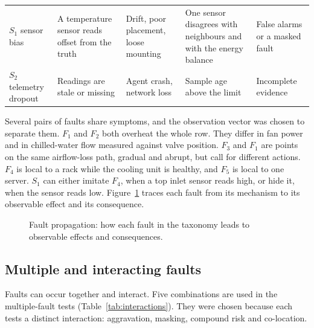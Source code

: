 \begin{small}
\begin{longtable}{L{2.0cm}L{2.9cm}L{2.8cm}L{3.3cm}L{2.5cm}}
  $S_1$ sensor bias & A temperature sensor reads offset from the truth & Drift, poor placement, loose mounting & One sensor disagrees with neighbours and with the energy balance & False alarms or a masked fault \\
  $S_2$ telemetry dropout & Readings are stale or missing & Agent crash, network loss & Sample age above the limit & Incomplete evidence \\
  \bottomrule
\end{longtable}
\end{small}

Several pairs of faults share symptoms, and the observation vector was chosen to separate them. $F_1$ and $F_2$ both overheat the whole row. They differ in fan power and in chilled-water flow measured against valve position. $F_3$ and $F_1$ are points on the same airflow-loss path, gradual and abrupt, but call for different actions. $F_4$ is local to a rack while the cooling unit is healthy, and $F_5$ is local to one server. $S_1$ can either imitate $F_4$, when a top inlet sensor reads high, or hide it, when the sensor reads low. Figure~\ref{fig:propagation} traces each fault from its mechanism to its observable effect and its consequence.

\begin{figure}[htbp]
  \centering
  
  \caption{Fault propagation: how each fault in the taxonomy leads to observable effects and consequences.}
  \label{fig:propagation}
\end{figure}

\subsection{Multiple and interacting faults}

Faults can occur together and interact. Five combinations are used in the multiple-fault tests (Table~\ref{tab:interactions}). They were chosen because each tests a distinct interaction: aggravation, masking, compound risk and co-location.

